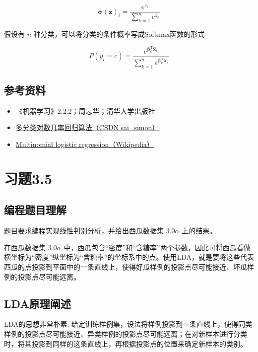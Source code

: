 \documentclass{ctexart}
\begin{document}
	\begin{equation}
		\bm{\sigma}(\bm{z})_i=\frac{e^{z_i}}{\sum\limits_{k=1}^{n}e^{z_k}}
	\end{equation}

	假设有 $n$ 种分类，可以将分类的条件概率写成Softmax函数的形式
	
	\begin{equation}
		P(y_i=c)=\frac{e^{\bm{\beta}_c^\mathrm{T}\hat{\bm{x}}_i}}{\sum\limits_{k=1}^{n}e^{\bm{\beta}_k^\mathrm{T}\hat{\bm{x}}_i}}
	\end{equation}
	
	\subsection{参考资料}
	
	\begin{itemize}
		\item 《机器学习》2.2.2；周志华；清华大学出版社
		\item \href{https://blog.csdn.net/sai_simon/article/details/122470130}{多分类对数几率回归算法（CSDN sai\_simon）}
		\item \href{https://en.wikipedia.org/wiki/Multinomial_logistic_regression}{Multinomial logistic regression（Wikipedia）}
	\end{itemize}

	\section{习题3.5}
	\subsection{编程题目理解}
	
	题目要求编程实现线性判别分析，并给出西瓜数据集 $3.0\alpha$ 上的结果。
	
	在西瓜数据集 $3.0\alpha$ 中，西瓜包含“密度”和“含糖率”两个参数，因此可将西瓜看做横坐标为“密度”纵坐标为“含糖率”的坐标系中的点。使用LDA，就是要将这些代表西瓜的点投影到平面中的一条直线上，使得好瓜样例的投影点尽可能接近、坏瓜样例的投影点尽可能远离。
	
	\subsection{LDA原理阐述}
	\label{Section_LDA_Theory}
	
	LDA的思想非常朴素: 给定训练样例集，设法将样例投影到一条直线上，使得同类样例的投影点尽可能接近、异类样例的投影点尽可能远离；在对新样本进行分类时，将其投影到同样的这条直线上，再根据投影点的位置来确定新样本的类别。
	
\end{document}
